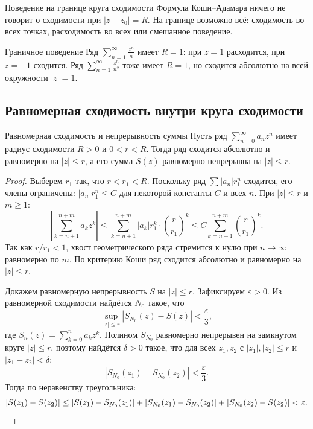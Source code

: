 \begin{Remark}{Поведение на границе круга сходимости}{}
	Формула Коши--Адамара ничего не говорит о сходимости при $|z-z_0|=R$.
	На границе возможно всё: сходимость во всех точках, расходимость во всех или смешанное поведение.
\end{Remark}

\begin{Example}{Граничное поведение}{}
	Ряд $\displaystyle\sum_{n=1}^{\infty}\frac{z^n}{n}$ имеет $R=1$:
	при $z=1$ расходится, при $z=-1$ сходится.
	Ряд $\displaystyle\sum_{n=1}^{\infty}\frac{z^n}{n^2}$ тоже имеет $R=1$,
	но сходится абсолютно на всей окружности $|z|=1$.
\end{Example}

\subsection{Равномерная сходимость внутри круга сходимости}

\begin{Theorem}{Равномерная сходимость и непрерывность суммы}{}
	Пусть ряд $\sum_{n=0}^{\infty}a_nz^n$ имеет радиус сходимости $R>0$
	и $0<r<R$. Тогда ряд сходится абсолютно и равномерно на $|z|\le r$,
	а его сумма $S(z)$ равномерно непрерывна на $|z|\le r$.
\end{Theorem}

\begin{proof}
	Выберем $r_1$ так, что $r<r_1<R$. Поскольку ряд $\sum|a_n|r_1^n$ сходится,
	его члены ограничены: $|a_n|r_1^n\le C$ для некоторой константы $C$ и всех $n$.
	При $|z|\le r$ и $m\ge1$:
	\[
	\left|\sum_{k=n+1}^{n+m}a_kz^k\right|
	\le\sum_{k=n+1}^{n+m}|a_k|r_1^k\cdot\left(\frac{r}{r_1}\right)^k
	\le C\sum_{k=n+1}^{n+m}\left(\frac{r}{r_1}\right)^k.
	\]
	Так как $r/r_1<1$, хвост геометрического ряда стремится к нулю при $n\to\infty$
	равномерно по $m$. По критерию Коши ряд сходится абсолютно и равномерно на $|z|\le r$.
	
	Докажем равномерную непрерывность $S$ на $|z|\le r$.
	Зафиксируем $\varepsilon>0$. Из равномерной сходимости найдётся $N_0$ такое, что
	\[
	\sup_{|z|\le r}|S_{N_0}(z)-S(z)|<\frac\varepsilon3,
	\]
	где $S_n(z)=\sum_{k=0}^na_kz^k$. Полином $S_{N_0}$ равномерно непрерывен на
	замкнутом круге $|z|\le r$, поэтому найдётся $\delta>0$ такое, что для всех
	$z_1,z_2$ с $|z_1|,|z_2|\le r$ и $|z_1-z_2|<\delta$:
	\[
	|S_{N_0}(z_1)-S_{N_0}(z_2)|<\frac\varepsilon3.
	\]
	Тогда по неравенству треугольника:
	\[
	|S(z_1)-S(z_2)|\le|S(z_1)-S_{N_0}(z_1)|+|S_{N_0}(z_1)-S_{N_0}(z_2)|+|S_{N_0}(z_2)-S(z_2)|<\varepsilon.\qedhere
	\]
\end{proof}


